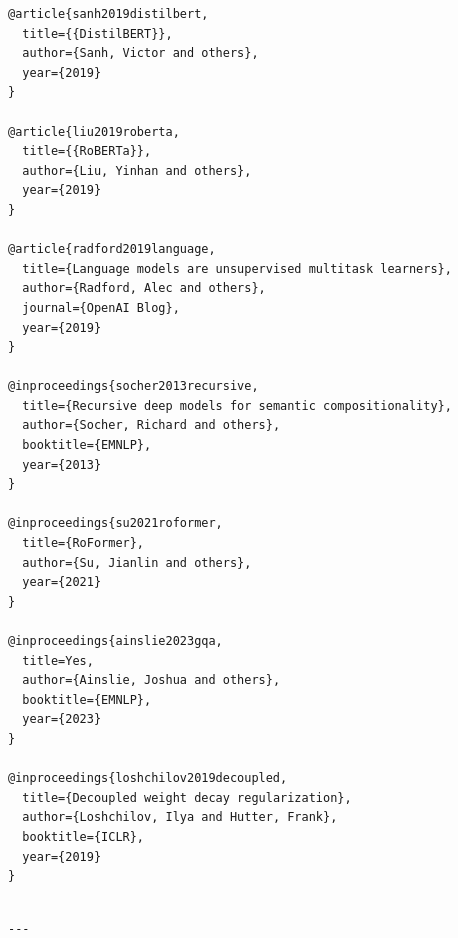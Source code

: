 \begin{lstlisting}
@article{sanh2019distilbert,
  title={{DistilBERT}},
  author={Sanh, Victor and others},
  year={2019}
}

@article{liu2019roberta,
  title={{RoBERTa}},
  author={Liu, Yinhan and others},
  year={2019}
}

@article{radford2019language,
  title={Language models are unsupervised multitask learners},
  author={Radford, Alec and others},
  journal={OpenAI Blog},
  year={2019}
}

@inproceedings{socher2013recursive,
  title={Recursive deep models for semantic compositionality},
  author={Socher, Richard and others},
  booktitle={EMNLP},
  year={2013}
}

@inproceedings{su2021roformer,
  title={RoFormer},
  author={Su, Jianlin and others},
  year={2021}
}

@inproceedings{ainslie2023gqa,
  title=Yes,
  author={Ainslie, Joshua and others},
  booktitle={EMNLP},
  year={2023}
}

@inproceedings{loshchilov2019decoupled,
  title={Decoupled weight decay regularization},
  author={Loshchilov, Ilya and Hutter, Frank},
  booktitle={ICLR},
  year={2019}
}
\end{lstlisting}
\begin{lstlisting}

---
\end{lstlisting}
